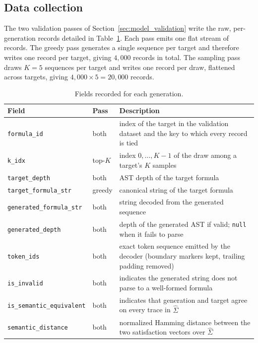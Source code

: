 \documentclass[titlepage,a4paper,11pt]{report}
\begin{document}
    \subsection{Data collection}\label{sec:data_collection}
    The two validation passes of Section~\ref{sec:model_validation} write the raw, per-generation records detailed in Table~\ref{tab:validation_record_schema}. Each pass emits one flat stream of records. The greedy pass generates a single sequence per target and therefore writes one record per target, giving $4{,}000$ records in total. The sampling pass draws $K = 5$ sequences per target and writes one record per draw, flattened across targets, giving $4{,}000 \times 5 = 20{,}000$ records.

    \begin{table}[ht]
        \centering
        \caption{Fields recorded for each generation.}
        \label{tab:validation_record_schema}
        \begin{tabular}{l l p{7.4cm}}
            \toprule
            Field & Pass & Description \\
            \midrule
            \texttt{formula\_id}                & both    & index of the target in the validation dataset and the key to which every record is tied \\
            \texttt{k\_idx}                     & top-$K$ & index $0,\dots,K{-}1$ of the draw among a target's $K$ samples \\
            \texttt{target\_depth}              & both    & AST depth of the target formula \\
            \texttt{target\_formula\_str}       & greedy  & canonical string of the target formula \\
            \texttt{generated\_formula\_str}    & both    & string decoded from the generated sequence \\
            \texttt{generated\_depth}           & both    & depth of the generated AST if valid; \texttt{null} when it fails to parse \\
            \texttt{token\_ids}                 & both    & exact token sequence emitted by the decoder (boundary markers kept, trailing padding removed) \\
            \texttt{is\_invalid}                & both    & indicates the generated string does not parse to a well-formed formula \\
            \texttt{is\_semantic\_equivalent}   & both    & indicates that generation and target agree on every trace in $\widehat\Sigma$ \\
            \texttt{semantic\_distance}         & both    & normalized Hamming distance between the two satisfaction vectors over $\widehat\Sigma$ \\
            \bottomrule
        \end{tabular}
    \end{table}
\end{document}
